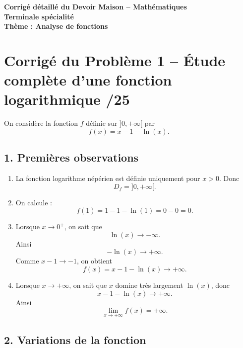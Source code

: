\documentclass[11pt,a4paper]{article}
\begin{document}
\begin{center}
    {\LARGE \textbf{Corrigé détaillé du Devoir Maison -- Mathématiques}}\\[0.3em]
    {\Large \textbf{Terminale spécialité}}\\[0.5em]
    {\large \textbf{Thème : Analyse de fonctions}}\\[0.8em]
\end{center}



\section*{Corrigé du Problème 1 -- Étude complète d'une fonction logarithmique \hfill /25}

On considère la fonction \(f\) définie sur \(]0,+\infty[\) par
\[
f(x)=x-1-\ln(x).
\]

\subsection*{1. Premières observations}

\begin{enumerate}
    \item La fonction logarithme népérien est définie uniquement pour \(x>0\). Donc
    \[
    D_f=]0,+\infty[.
    \]

    \item On calcule :
    \[
    f(1)=1-1-\ln(1)=0-0=0.
    \]

    \item Lorsque \(x\to 0^+\), on sait que
    \[
    \ln(x)\to -\infty.
    \]
    Ainsi
    \[
    -\ln(x)\to +\infty.
    \]
    Comme \(x-1\to -1\), on obtient
    \[
    f(x)=x-1-\ln(x)\to +\infty.
    \]

    \item Lorsque \(x\to +\infty\), on sait que \(x\) domine très largement \(\ln(x)\), donc
    \[
    x-1-\ln(x)\to +\infty.
    \]
    Ainsi
    \[
    \lim_{x\to+\infty}f(x)=+\infty.
    \]
\end{enumerate}

\subsection*{2. Variations de la fonction}
\end{document}
